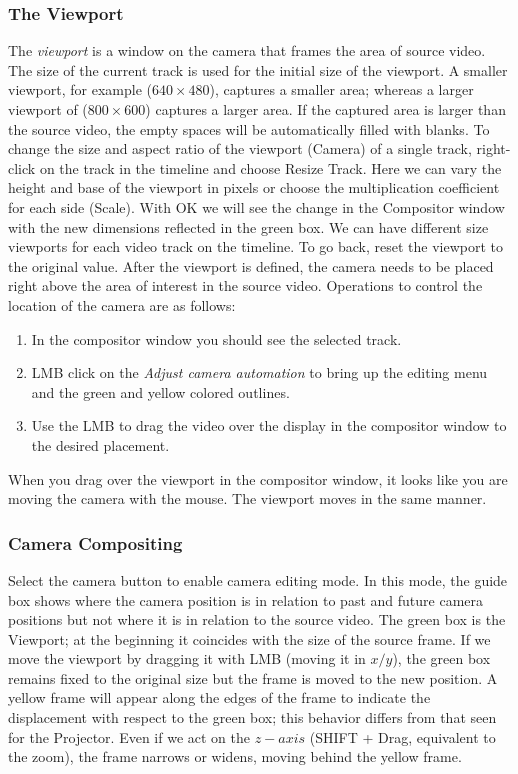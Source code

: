 \subsubsection*{The Viewport}%
\label{ssub:viewport}

The \textit{viewport} is a window on the camera that frames the area of source video. The size of the current track is used for the initial size of the viewport. A smaller viewport, for example ($640\times480$), captures a smaller area; whereas a larger viewport of ($800\times600$) captures a larger area.  If the captured area is larger than the source video, the empty spaces will be automatically filled with blanks.  To change the size and aspect ratio of the viewport (Camera) of a single track, right-click on the track in the timeline and choose Resize Track. Here we can vary the height and base of the viewport in pixels or choose the multiplication coefficient for each side (Scale). With OK we will see the change in the Compositor window with the new dimensions reflected in the green box. We can have different size viewports for each video track on the timeline. To go back, reset the viewport to the original value. After the viewport is defined, the camera needs to be placed right above the area of interest in the source video. Operations to control the location of the camera are as follows:

\begin{enumerate}
    \item  In the compositor window you should see the selected track.
    \item  LMB click on the \textit{Adjust camera automation} to bring up the editing menu and the 
green and yellow colored outlines.
    \item  Use the LMB to drag the video over the display in the compositor window to the desired
placement.
\end{enumerate}

When you drag over the viewport in the compositor window, it looks like you are moving the camera
with the mouse.  The viewport moves in the same manner.

\subsubsection*{Camera Compositing}%
\label{ssub:camera_compositing}

Select the camera button to enable camera editing mode. 
In this mode, the guide box shows where the camera position is in relation to past and future camera positions but not where it is in relation to the source video. 
The green box is the Viewport; at the beginning it coincides with the size of the source frame. If we move the viewport by dragging it with LMB (moving it in $x/y$), the green box remains fixed to the original size but the frame is moved to the new position.  A yellow frame will appear along the edges of the frame to indicate the displacement with respect to the green box; this behavior differs from that seen for the Projector. Even if we act on the $z-axis$ (SHIFT + Drag, equivalent to the zoom), the frame narrows or widens, moving behind the yellow frame.


